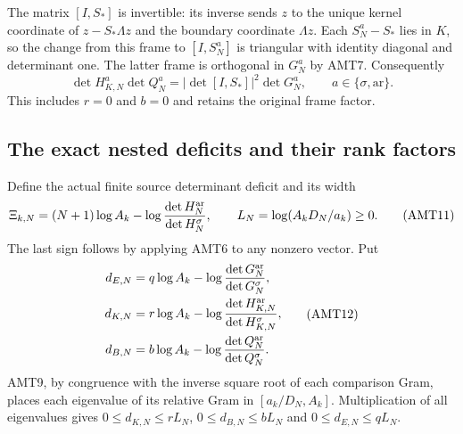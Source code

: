 \documentclass[11pt,a4paper]{article}
\begin{document}
The matrix $[I,S_*]$ is invertible: its inverse sends $z$ to the
unique kernel coordinate of $z-S_*\Lambda z$ and the boundary
coordinate $\Lambda z$. Each $S_N^a-S_*$ lies in $K$, so the
change from this frame to $[I,S_N^a]$ is triangular with identity
diagonal and determinant one. The latter frame is orthogonal in
$G_N^a$ by AMT7. Consequently
\[
 \boxed{\quad\det H_{K,N}^a\det Q_N^a
       =|\det[I,S_*]|^2\det G_N^a,\qquad a\in\{\sigma,\mathrm{ar}\}.\quad}
 \tag{AMT10}
\]
This includes $r=0$ and $b=0$ and retains the original frame factor.

\subsection{The exact nested deficits and their rank factors}
Define the actual finite source determinant deficit and its width
\[
 \Xi_{k,N}=(N+1)\log A_k-
                  \log\frac{\det H_N^{\rm ar}}{\det H_N^\sigma},
 \qquad L_N=\log(A_kD_N/a_k)\ge0.
 \tag{AMT11}
\]
The last sign follows by applying AMT6 to any nonzero vector.
Put
\[
\begin{aligned}
 d_{E,N}&=q\log A_k-\log\frac{\det G_N^{\rm ar}}{\det G_N^\sigma},\\
 d_{K,N}&=r\log A_k-\log\frac{\det H_{K,N}^{\rm ar}}{\det H_{K,N}^\sigma},\\
 d_{B,N}&=b\log A_k-\log\frac{\det Q_N^{\rm ar}}{\det Q_N^\sigma}.
\end{aligned}\tag{AMT12}
\]
AMT9, by congruence with the inverse square root of each comparison
Gram, places each eigenvalue of its relative Gram in
$[a_k/D_N,A_k]$. Multiplication of all eigenvalues gives
$0\le d_{K,N}\le rL_N$, $0\le d_{B,N}\le bL_N$ and
$0\le d_{E,N}\le qL_N$.
\end{document}
